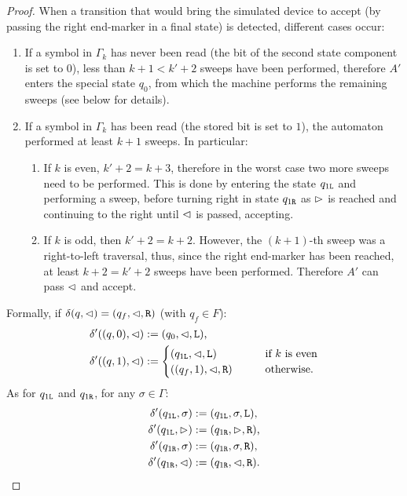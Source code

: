 \begin{proof}
	When a transition that would bring the simulated device to accept (by passing the right end-marker in a final state) is detected, different cases occur:
	\begin{enumerate}
		\item If a symbol in $\Gamma_k$ has never been read (\ie the bit of the second state component is set to $0$), less than $k+1<k'+2$ sweeps have been performed, therefore $A'$ enters the special state $q_0$, from which the machine performs the remaining sweeps (see below for details).
		\item If a symbol in $\Gamma_k$ has been read (\ie the stored bit is set to $1$), the automaton performed at least $k+1$ sweeps. In particular:
		      \begin{enumerate}
			      \item If $k$ is even, $k'+2=k+3$, therefore in the worst case two more sweeps need to be performed.
			            This is done by entering the state $q_{1\mathtt{L}}$ and performing a sweep, before turning right in state $q_{1\mathtt{R}}$ as $\rhd$ is reached and continuing to the right until $\lhd$ is passed, accepting.
			      \item If $k$ is odd, then $k'+2=k+2$. However, the $(k+1)$-th sweep was a right-to-left traversal, thus, since the right end-marker has been reached, at least $k+2=k'+2$ sweeps have been performed. Therefore $A'$ can pass $\lhd$ and accept.
		      \end{enumerate}
	\end{enumerate}

	Formally, if $\delta(q,\lhd)=(q_f,\lhd,\mathtt R)$ (with $q_f\in F$):
	\begin{align*}
		\delta'((q,0),\lhd) & := (q_0,\lhd,\mathtt L) \text,                               \\
		\delta'((q,1),\lhd) & := \begin{cases}
			                         (q_{1\mathtt{L}},\lhd,\mathtt L) \qquad     & \text{if $k$ is even}   \\
			                         ((q_f,1),\lhd,\mathtt R) \qquad & \text{otherwise} \text.
		                         \end{cases}
	\end{align*}
	As for $q_{1\mathtt{L}}$ and $q_{1\mathtt{R}}$, for any $\sigma\in\Gamma$:
	\begin{align*}
		\delta'(q_{1\mathtt{L}},\sigma) & :=(q_{1\mathtt{L}},\sigma,\mathtt L) \text, \\
		\delta'(q_{1\mathtt{L}},\rhd)   & :=(q_{1\mathtt{R}},\rhd,\mathtt R) \text,   \\
		\delta'(q_{1\mathtt{R}},\sigma) & :=(q_{1\mathtt{R}},\sigma,\mathtt R) \text, \\
		\delta'(q_{1\mathtt{R}},\lhd)   & :=(q_{1\mathtt{R}},\lhd,\mathtt R) \text.
	\end{align*}


\end{proof}
